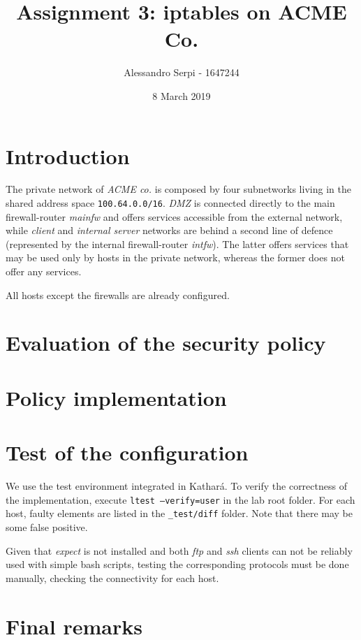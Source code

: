 \documentclass[draft]{homework}
\title{Assignment 3: iptables on ACME Co.}
\author{Alessandro Serpi - 1647244}
\date{8 March 2019}
\newcommand{\kat}{Kathará\xspace}
\newcommand{\client}{\textit{client}\xspace}
\newcommand{\dmz}{\textit{DMZ}\xspace}
\newcommand{\ser}{\textit{internal server}\xspace}
\newcommand{\intfw}{\textit{intfw}\xspace}
\newcommand{\mainfw}{\textit{mainfw}\xspace}
\begin{document}
    \maketitle
    \tableofcontents
    
    \pagebreak
    \section{Introduction}
    The private network of \textit{ACME co.} is composed by four subnetworks living in the shared address space \texttt{100.64.0.0/16}. \dmz is connected directly to the main firewall-router \mainfw and offers services accessible from the external network, while \client and \ser networks are behind a second line of defence (represented by the internal firewall-router \intfw). The latter offers services that may be used only by hosts in the private network, whereas the former does not offer any services.
    
    All hosts except the firewalls are already configured. 
    
    
    \section{Evaluation of the security policy}
    
    
    \section{Policy implementation}
    
    
    \section{Test of the configuration}
    We use the test environment integrated in \kat.
    To verify the correctness of the implementation, execute \texttt{ltest --verify=user} in the lab root folder.
    For each host, faulty elements are listed in the \texttt{\_test/diff} folder.
    Note that there may be some false positive.
    
    Given that \textit{expect} is not installed and both \textit{ftp} and \textit{ssh} clients can not be reliably used with simple bash scripts, testing the corresponding protocols must be done manually, checking the connectivity for each host.
    
    
    \section{Final remarks}
\end{document}
